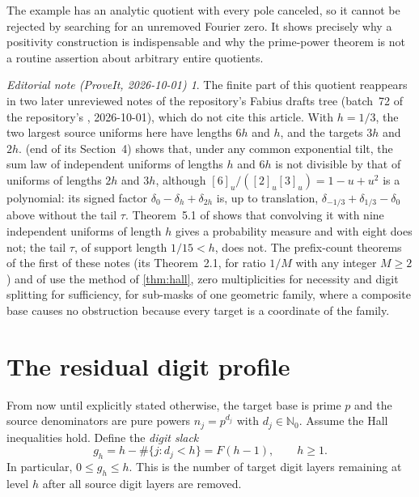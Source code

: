 \documentclass[11pt,a4paper]{article}
\theoremstyle{remark}
\newtheorem*{ednotethird}{Editorial note (ProveIt, 2026-10-01)}
\newcommand{\Nzero}{\mathbb N_0}
\begin{document}
The example has an analytic quotient with every pole canceled, so it cannot be
rejected by searching for an unremoved Fourier zero. It shows precisely why a
positivity construction is indispensable and why the prime-power theorem is
not a routine assertion about arbitrary entire quotients.
\begin{ednotethird}
The finite part of this quotient reappears in two later unreviewed notes of
the repository's Fabius drafts tree (batch~72 of the repository's , 2026-10-01),
which do not cite this article. With $h=1/3$, the two largest source uniforms
here have lengths $6h$ and $h$, and the targets $3h$ and $2h$.
 (end of its
Section~4) shows that, under any common exponential tilt, the sum law of
independent uniforms of lengths $h$ and $6h$ is not divisible by that of
uniforms of lengths $2h$ and $3h$, although
$[6]_u/([2]_u[3]_u)=1-u+u^2$ is a polynomial: its signed factor
$\delta_0-\delta_h+\delta_{2h}$ is, up to translation,
$\delta_{-1/3}+\delta_{1/3}-\delta_0$ above without the tail $\tau$.
Theorem~5.1 of 
shows that convolving it with nine independent uniforms of length $h$ gives a
probability measure and with eight does not; the tail $\tau$, of support
length $1/15<h$, does not. The prefix-count theorems of the first of these
notes (its Theorem~2.1, for ratio $1/M$ with any integer $M\ge2$) and of
 use the method
of \cref{thm:hall}, zero multiplicities for necessity and digit splitting for
sufficiency, for sub-masks of one geometric family, where a composite base
causes no obstruction because every target is a coordinate of the family.
\end{ednotethird}

\section{The residual digit profile}
\label{sec:digits}

From now until explicitly stated otherwise, the target base is prime $p$ and
the source denominators are pure powers $n_j=p^{d_j}$ with $d_j\in\Nzero$.
Assume the Hall inequalities hold. Define the \emph{digit slack}
\begin{equation}
 g_h=h-\#\{j:d_j<h\}=F(h-1),\qquad h\ge1.
 \label{eq:digit-slack}
\end{equation}
In particular, $0\le g_h\le h$. This is the number of target digit layers
remaining at level $h$ after all source digit layers are removed.
\end{document}
